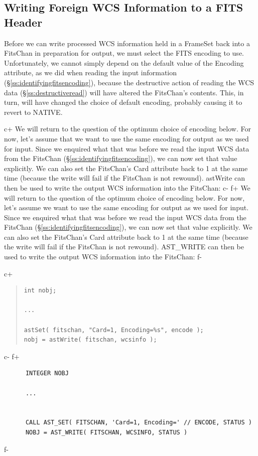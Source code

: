 \documentclass[twoside,11pt]{article}
\newcommand{\secref}[1]{\S\ref{#1}}
\newcommand{\secref}[1]{\ref{#1}}
\begin{document}
\subsection{\label{ss:writingforeignfits}Writing Foreign WCS Information to a FITS Header}

Before we can write processed WCS information held in a FrameSet back
into a FitsChan in preparation for output, we must select the FITS
encoding to use.  Unfortunately, we cannot simply depend on the
default value of the Encoding attribute, as we did when reading the
input information (\secref{ss:identifyingfitsencoding}), because the
destructive action of reading the WCS data
(\secref{ss:destructiveread}) will have altered the FitsChan's
contents. This, in turn, will have changed the choice of default
encoding, probably causing it to revert to NATIVE.

c+
We will return to the question of the optimum choice of encoding
below.  For now, let's assume that we want to use the same encoding
for output as we used for input. Since we enquired what that was
before we read the input WCS data from the FitsChan
(\secref{ss:identifyingfitsencoding}), we can now set that value
explicitly. We can also set the FitsChan's Card attribute back to 1 at
the same time (because the write will fail if the FitsChan is not
rewound). astWrite can then be used to write the output WCS
information into the FitsChan:
c-
f+
We will return to the question of the optimum choice of encoding
below.  For now, let's assume we want to use the same encoding for
output as we used for input. Since we enquired what that was before we
read the input WCS data from the FitsChan
(\secref{ss:identifyingfitsencoding}), we can now set that value
explicitly. We can also set the FitsChan's Card attribute back to 1 at
the same time (because the write will fail if the FitsChan is not
rewound). AST\_WRITE can then be used to write the output WCS
information into the FitsChan:
f-

c+
\begin{quote}
\small
\begin{verbatim}
int nobj;

...

astSet( fitschan, "Card=1, Encoding=%s", encode );
nobj = astWrite( fitschan, wcsinfo );
\end{verbatim}
\normalsize
\end{quote}
c-
f+
\small
\begin{verbatim}
      INTEGER NOBJ

      ...


      CALL AST_SET( FITSCHAN, 'Card=1, Encoding=' // ENCODE, STATUS )
      NOBJ = AST_WRITE( FITSCHAN, WCSINFO, STATUS )
\end{verbatim}
\normalsize
f-
\end{document}
